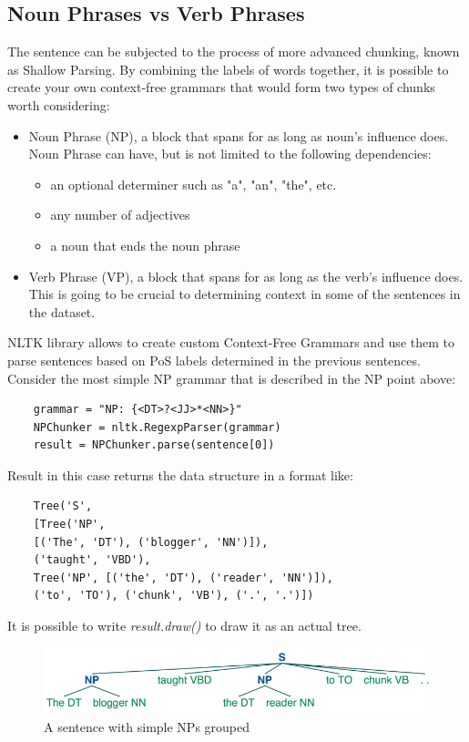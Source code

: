 \documentclass{article}
\begin{document}
\subsection{Noun Phrases vs Verb Phrases}
The sentence can be subjected to the process of more advanced chunking, known as Shallow Parsing. By combining the labels of words together, it is possible to create your own context-free grammars that would form two types of chunks worth considering:
\begin{itemize}
    \item Noun Phrase (NP), a block that spans for as long as noun's influence does. Noun Phrase can have, but is not limited to the following dependencies:
    \begin{itemize}
        \item an optional determiner such as "a", "an", "the", etc.
        \item any number of adjectives
        \item a noun that ends the noun phrase
    \end{itemize}
    \item Verb Phrase (VP), a block that spans for as long as the verb's influence does. This is going to be crucial to determining context in some of the sentences in the dataset.
\end{itemize}
NLTK library allows to create custom Context-Free Grammars and use them to parse sentences based on PoS labels determined in the previous sentences.
Consider the most simple NP grammar that is described in the NP point above:
\begin{verbatim}
    grammar = "NP: {<DT>?<JJ>*<NN>}"
    NPChunker = nltk.RegexpParser(grammar)
    result = NPChunker.parse(sentence[0])
\end{verbatim}
Result in this case returns the data structure in a format like:
\begin{verbatim}
    Tree('S', 
    [Tree('NP', 
    [('The', 'DT'), ('blogger', 'NN')]), 
    ('taught', 'VBD'), 
    Tree('NP', [('the', 'DT'), ('reader', 'NN')]), 
    ('to', 'TO'), ('chunk', 'VB'), ('.', '.')])
\end{verbatim}
It is possible to write \textit{result.draw()} to draw it as an actual tree.
\begin{figure}[htb!]
    \centering
\includegraphics[width=\textwidth]{nickcdryanblog1.png}
    \caption{A sentence with simple NPs grouped}
\end{figure}\\
\end{document}
